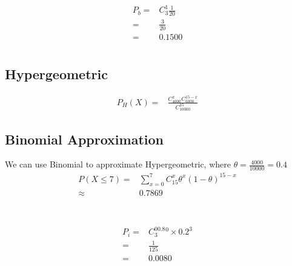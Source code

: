\documentclass{article}
\begin{document}
            \subsubsection{}
                \begin{equation*}
                    \begin{split}
                        P_b=&C_3^1\frac{1}{20}\\
                            =&\frac{3}{20}\\
                            =&0.1500
                    \end{split}
                \end{equation*}
    \section{}
        \subsection*{Hypergeometric}
            \begin{equation*}
                \begin{split}
                    P_H(X)=&\frac{C_{4000}^xC_{6000}^{15-x}}{C_{10000}^15}
                \end{split}
            \end{equation*}
        \subsection*{Binomial Approximation}
            We can use Binomial to approximate Hypergeometric, where $\theta=\frac{4000}{10000}=0.4$
            \begin{equation*}
                \begin{split}
                    P(X\leq 7)=&\sum_{x=0}^7 C_{15}^x \theta^x(1-\theta)^{15-x}\\
                        \approx&0.7869\\
                \end{split}
            \end{equation*}
    \section{}
        \subsection{}
            \subsubsection{}
                \begin{equation*}
                    \begin{split}
                        P_i=&C_3^00.8^0\times 0.2^3\\
                            =&\frac{1}{125}\\
                            =&0.0080
                    \end{split}
                \end{equation*}
\end{document}

